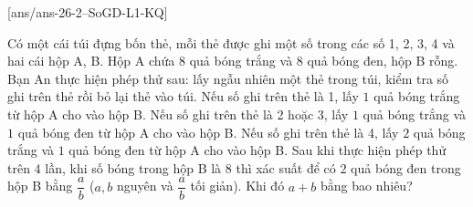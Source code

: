 \caukq
{}[ans/ans-26-2--SoGD-L1-KQ]
\begin{ex} %
	Có một cái túi đựng bốn thẻ, mỗi thẻ được ghi một số trong các số 1, 2, 3, 4 và hai cái hộp A, B. Hộp A chứa $8$ quả bóng trắng và $8$ quả bóng đen, hộp B rỗng. Bạn An thực hiện phép thử sau: lấy ngẫu nhiên một thẻ trong túi, kiểm tra số ghi trên thẻ rồi bỏ lại thẻ vào túi. Nếu số ghi trên thẻ là 1, lấy $1$ quả bóng trắng từ hộp A cho vào hộp B. Nếu số ghi trên thẻ là 2 hoặc 3, lấy $1$ quả bóng trắng và $1$ quả bóng đen từ hộp A cho vào hộp B. Nếu số ghi trên thẻ là 4, lấy $2$ quả bóng trắng và $1$ quả bóng đen từ hộp A cho vào hộp B. Sau khi thực hiện phép thử trên $4$ lần, khi số bóng trong hộp B là $8$ thì xác suất để có $2$ quả bóng đen trong hộp B	bằng $\dfrac{a}{b}$ ($a, b$ nguyên và $\dfrac{a}{b}$ tối giản). Khi đó $a + b$ bằng bao nhiêu?
\end{ex}

